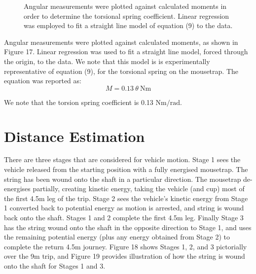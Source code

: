 \documentclass[a4paper]{article}
\begin{document}
\begin{figure}[h]
	\centering
	\caption{Angular measurements were plotted against calculated moments in order to determine the torsional spring coefficient. Linear regression was employed to fit a straight line model of equation (9) to the data.}
\end{figure}

Angular measurements were plotted against calculated moments, as shown in Figure 17. Linear regression was used to fit a straight line model, forced through the origin, to the data. We note that this model is is experimentally representative of equation (9), for the torsional spring on the mousetrap. The equation was reported as:
\begin{equation}
	M = 0.13 \ \theta \ \si{\newton\meter}
\end{equation}

We note that the torsion spring coefficient is 0.13 $\si{\newton\meter\per\radian}$.

\section{Distance Estimation}
There are three stages that are considered for vehicle motion. Stage 1 sees the vehicle released from the starting position with a fully energised mousetrap. The string has been wound onto the shaft in a particular direction. The mousetrap de-energises partially, creating kinetic energy, taking the vehicle (and cup) most of the first 4.5$\si{\meter}$ leg of the trip. Stage 2 sees the vehicle's kinetic energy from Stage 1 converted back to potential energy as motion is arrested, and string is wound back onto the shaft. Stages 1 and 2 complete the first 4.5$\si{\meter}$ leg. Finally Stage 3 has the string wound onto the shaft in the opposite direction to Stage 1, and uses the remaining potential energy (plus any energy obtained from Stage 2) to complete the return 4.5m journey. Figure 18 shows Stages 1, 2, and 3 pictorially over the 9m trip, and Figure 19 provides illustration of how the string is wound onto the shaft for Stages 1 and 3.
\end{document}
